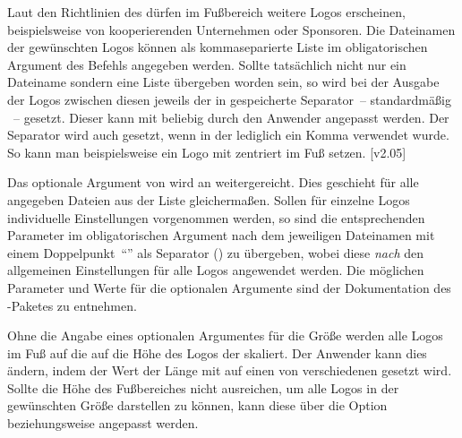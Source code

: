 \begin{Declaration*}{}
\begin{Declaration*}{}
\begin{Declaration*}{}
\begin{Declaration}[v2.03]{%
  \LParameter{}%
}
\begin{Declaration}[v2.03]{}
\begin{Declaration}[v2.03]{}
Laut den Richtlinien des \CDs dürfen im Fußbereich weitere Logos erscheinen, 
beispielsweise von kooperierenden Unternehmen oder Sponsoren. Die Dateinamen 
der gewünschten Logos können als kommaseparierte Liste im obligatorischen 
Argument des Befehls  angegeben werden. Sollte tatsächlich 
nicht nur ein Dateiname sondern eine Liste übergeben worden sein, so wird bei 
der Ausgabe der Logos zwischen diesen jeweils der in  
gespeicherte Separator~-- standardmäßig ~-- gesetzt. Dieser kann 
mit \PParameter{\dots} beliebig durch 
den Anwender angepasst werden. Der Separator wird auch gesetzt, wenn in der 
 lediglich ein Komma verwendet wurde. So kann man 
beispielsweise ein Logo mit  
zentriert im Fuß setzen.
[v2.05]

Das optionale Argument von  wird an  
weitergereicht. Dies geschieht für alle angegeben Dateien aus der Liste 
gleichermaßen. Sollen für einzelne Logos individuelle Einstellungen vorgenommen 
werden, so sind die entsprechenden Parameter im obligatorischen Argument nach 
dem jeweiligen Dateinamen mit einem Doppelpunkt~\enquote{\PValue{:}} als 
Separator () zu 
übergeben, wobei diese \emph{nach} den allgemeinen Einstellungen für alle Logos 
angewendet werden. Die möglichen Parameter und Werte für die optionalen 
Argumente sind der Dokumentation des -Paketes zu entnehmen.

Ohne die Angabe eines optionalen Argumentes für die Größe werden alle Logos im 
Fuß auf die auf die Höhe des Logos der \TnUD skaliert. Der Anwender kann dies 
ändern, indem der Wert der Länge  mit  
auf einen von \PValue{0pt} verschiedenen gesetzt wird. Sollte die Höhe des 
Fußbereiches nicht ausreichen, um alle Logos in der gewünschten Größe 
darstellen zu können, kann diese über die Option  
beziehungsweise  angepasst werden.
\end{Declaration}
\end{Declaration}
\end{Declaration}


\end{Declaration*}
\end{Declaration*}
\end{Declaration*}
